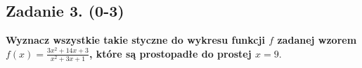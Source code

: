 \subsection*{Zadanie 3. (0-3)}
\textbf{Wyznacz wszystkie takie styczne do wykresu funkcji $f$ zadanej wzorem $f(x)=\frac{3x^2+14x+3}{x^2+3x+1}$, które są prostopadłe do prostej $x=9$}.